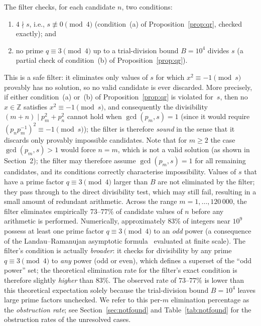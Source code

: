 \documentclass{amsart}
\theoremstyle{definition}
\theoremstyle{remark}
\numberwithin{equation}{section}
\begin{document}
The filter checks, for each candidate $n$, two conditions:
\begin{enumerate}
	\item[(a)] $4 \nmid s$, i.e., $s \not\equiv 0 \pmod{4}$
	(condition~(a) of Proposition~\ref{prop:qr}, checked exactly); and
	\item[(b$'$)] no prime $q \equiv 3 \pmod{4}$ up to a trial-division
	bound $B = 10^4$ divides $s$ (a partial check of
	condition~(b) of Proposition~\ref{prop:qr}).
\end{enumerate}
This is a safe filter: it eliminates only values of $s$ for which
$x^2 \equiv -1 \pmod{s}$ provably has no solution, so no valid
candidate is ever discarded.
More precisely, if either condition~(a) or~(b) of
Proposition~\ref{prop:qr} is violated for~$s$, then no
$x \in \mathbb{Z}$ satisfies $x^2 \equiv -1 \pmod{s}$, and
consequently the divisibility $(m+n) \mid p_m^2 + p_n^2$ cannot hold
when $\gcd(p_m, s) = 1$ (since it would require
$(p_n p_m^{-1})^2 \equiv -1 \pmod{s}$); the filter is therefore
\emph{sound} in the sense that it discards only provably impossible
candidates.
Note that for $m \geq 2$ the case $\gcd(p_m, s) > 1$ would force
$n = m$, which is not a valid solution (as shown in Section~2); the filter may therefore assume
$\gcd(p_m, s) = 1$ for all remaining candidates, and its conditions
correctly characterise impossibility.
Values of $s$ that have a prime factor $q \equiv 3 \pmod{4}$ larger
than $B$ are not eliminated by the filter; they pass through to the
direct divisibility test, which may still fail, resulting in a small
amount of redundant arithmetic.
Across the range $m = 1, \ldots, 120\,000$, the filter eliminates
empirically $73$--$77\%$ of candidate values of $n$ before any
arithmetic is performed.
Numerically, approximately $83\%$ of integers near $10^9$ possess at
least one prime factor $q \equiv 3 \pmod{4}$ to an \emph{odd} power
(a consequence of the Landau--Ramanujan asymptotic
formula~\cite{Landau1908} evaluated at finite scale).
The filter's condition is actually \emph{broader}: it checks for
divisibility by any prime $q \equiv 3 \pmod{4}$ to \emph{any} power
(odd or even), which defines a superset of the ``odd power'' set;
the theoretical elimination rate for the filter's exact condition is
therefore slightly \emph{higher} than $83\%$.
The observed rate of $73$--$77\%$ is lower than this theoretical
expectation solely because the trial-division bound $B = 10^4$
leaves large prime factors unchecked.
We refer to this per-$m$ elimination percentage as the
\emph{obstruction rate}; see Section~\ref{sec:notfound}
and Table~\ref{tab:notfound} for the obstruction rates of the
unresolved cases.
\end{document}

